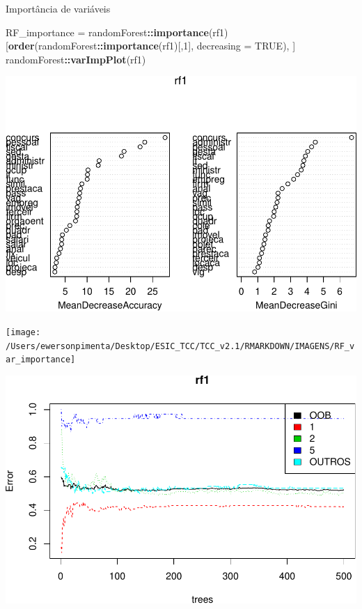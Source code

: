 \documentclass[]{article}
\newenvironment{Shaded}{\begin{snugshade}}{\end{snugshade}}
\newcommand{\DataTypeTok}[1]{\textcolor[rgb]{0.13,0.29,0.53}{#1}}
\newcommand{\DecValTok}[1]{\textcolor[rgb]{0.00,0.00,0.81}{#1}}
\newcommand{\KeywordTok}[1]{\textcolor[rgb]{0.13,0.29,0.53}{\textbf{#1}}}
\newcommand{\NormalTok}[1]{#1}
\newcommand{\OperatorTok}[1]{\textcolor[rgb]{0.81,0.36,0.00}{\textbf{#1}}}
\newcommand{\OtherTok}[1]{\textcolor[rgb]{0.56,0.35,0.01}{#1}}
\newcommand{\StringTok}[1]{\textcolor[rgb]{0.31,0.60,0.02}{#1}}
\begin{document}
Importância de variáveis

\begin{Shaded}
\begin{Highlighting}[]
\NormalTok{RF_importance =}\StringTok{ }\NormalTok{randomForest}\OperatorTok{::}\KeywordTok{importance}\NormalTok{(rf1)[}\KeywordTok{order}\NormalTok{(randomForest}\OperatorTok{::}\KeywordTok{importance}\NormalTok{(rf1)[,}\DecValTok{1}\NormalTok{], }\DataTypeTok{decreasing =} \OtherTok{TRUE}\NormalTok{), ]}
\NormalTok{randomForest}\OperatorTok{::}\KeywordTok{varImpPlot}\NormalTok{(rf1)}
\end{Highlighting}
\end{Shaded}

\includegraphics{markdown_v50_files/figure-latex/unnamed-chunk-91-1.pdf}

\texttt{[image: /Users/ewersonpimenta/Desktop/ESIC\_TCC/TCC\_v2.1/RMARKDOWN/IMAGENS/RF\_var\_importance]}

\begin{Shaded}
\end{Shaded}

\includegraphics{markdown_v50_files/figure-latex/unnamed-chunk-93-1.pdf}
\end{document}
